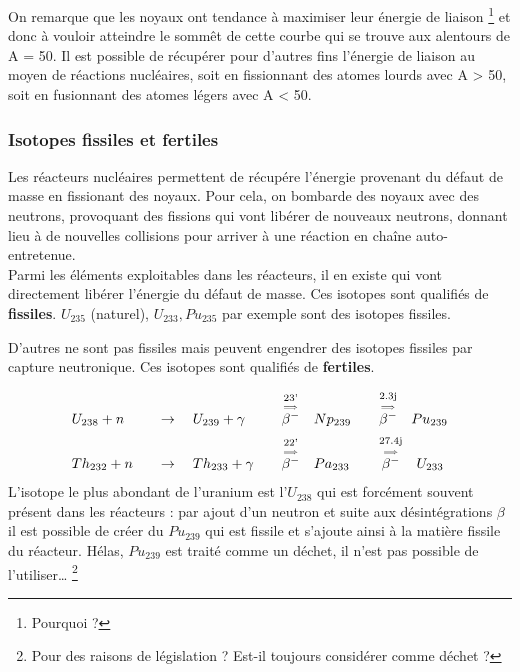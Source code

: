 On remarque que les noyaux ont tendance à maximiser leur énergie de liaison 
\footnote{Pourquoi ?} et donc à
vouloir atteindre le sommêt de cette courbe qui se trouve aux alentours de A = 50.
Il est possible de récupérer pour d'autres fins l'énergie de liaison au moyen de réactions nucléaires, soit
en fissionnant des atomes lourds avec A > 50, soit en fusionnant des atomes légers avec A < 50.

\subsubsection{Isotopes fissiles et fertiles}
Les réacteurs nucléaires permettent de récupére l'énergie provenant du défaut de masse en fissionant des
noyaux. Pour cela, on bombarde des noyaux avec des neutrons, provoquant des fissions qui vont libérer
de nouveaux neutrons, donnant lieu à de nouvelles collisions pour arriver à une réaction en chaîne
auto-entretenue.\\

Parmi les éléments exploitables dans les réacteurs, il en existe qui vont directement libérer l'énergie
du défaut de masse. Ces isotopes sont qualifiés de \textbf{fissiles}. $U_{235}$ (naturel), 
$U_{233}, Pu_{235}$ par exemple sont des isotopes fissiles.

D'autres ne sont pas fissiles mais peuvent engendrer des isotopes fissiles par capture neutronique.
Ces isotopes sont qualifiés de \textbf{fertiles}.

\begin{equation}
\begin{array}{llll}
U_{238} + n\quad&\to\quad U_{239}+\gamma\quad&\overset{\underset{\Longrightarrow}{\text{23'}}}{\beta^-}\quad Np_{239}\quad&\overset{\underset{\Longrightarrow}{\text{2.3j}}}{\beta^-}\quad Pu_{239}
\vspace{2mm}\\
Th_{232} + n\quad&\to\quad Th_{233}+\gamma\quad&\overset{\underset{\Longrightarrow}{\text{22'}}}{\beta^-}\quad Pa_{233}\quad&\overset{\underset{\Longrightarrow}{\text{27.4j}}}{\beta^-}\quad U_{233}
\end{array}
\end{equation}
L'isotope le plus abondant de l'uranium est l'$U_{238}$ qui est forcément souvent présent dans 
les réacteurs : par ajout d'un neutron  et suite aux désintégrations $\beta$ il est possible de
créer du $Pu_{239}$ qui est fissile et s'ajoute ainsi à la matière fissile du réacteur. Hélas, 
$Pu_{239}$ est traité comme un déchet, il n'est pas possible de l'utiliser\dots
\footnote{Pour des raisons de législation ? Est-il toujours considérer comme déchet ?}\\

